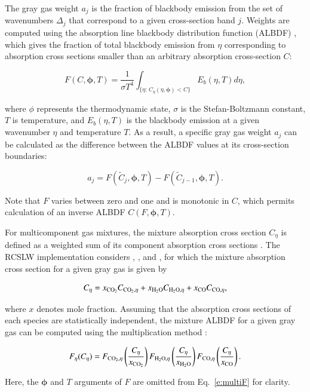 \documentclass[preprint,12pt]{elsarticle}
\newcommand{\BS}{\boldsymbol}
\newcounter{bla}
\begin{document}
The gray gas weight $a_j$ is the fraction of blackbody emission from the set of wavenumbers $\Delta_j$ that correspond to a given cross-section band $j$. Weights are computed using the absorption line blackbody distribution function (ALBDF) \cite{Pearson_2014}, which gives the fraction of total blackbody emission from $\eta$ corresponding to absorption cross sections smaller than an arbitrary absorption cross-section $C$:
%
\begin{linenomath}
\begin{equation} \label{e:albdf}
F(C,\BS{\phi},T) = \frac{1}{\sigma T^4}\int_{\{\eta:\,C_\eta(\eta,\BS{\phi})<C\}}E_b(\eta,T)d\eta,
\end{equation}
\end{linenomath}
%
where $\phi$ represents the thermodynamic state, $\sigma$ is the Stefan-Boltzmann constant, $T$ is temperature, and $E_b(\eta,T)$ is the blackbody emission at a given wavenumber $\eta$ and temperature $T$.
As a result, a specific gray gas weight $a_j$ can be calculated as the difference between the ALBDF values at its cross-section boundaries:
%
\begin{linenomath}
\begin{equation} \label{e:aj}
a_j = F(\tilde{C}_j,\BS{\phi}, T) - F(\tilde{C}_{j-1}, \BS{\phi},T).
\end{equation}
\end{linenomath}
%
Note that $F$ varies between zero and one and is monotonic in $C$, which permits calculation of an inverse ALBDF $C(F,\BS{\phi},T)$.

For multicomponent gas mixtures, the mixture absorption cross section $C_{\eta}$ is defined as a weighted sum of its component absorption cross sections \cite{Solovjov_2000}. The RCSLW implementation considers , , and , for which the mixture absorption cross section for a given gray gas is given by
%
\begin{linenomath}
\begin{equation} \label{e:multiC}
C_{\eta} = x_{\ce{CO2}}C_{\ce{CO2},\eta} + x_{\ce{H2O}}C_{\ce{H2O},\eta} + x_{\ce{CO}}C_{\ce{CO},\eta},
\end{equation}
\end{linenomath}
%
where $x$ denotes mole fraction.
Assuming that the absorption cross sections of each species are statistically independent, the mixture ALBDF for a given gray gas can be computed using the multiplication method \cite{Solovjov_2000}:
%
\begin{linenomath}
\begin{equation} \label{e:multiF}
F_{\eta}(C_{\eta}) = F_{\ce{CO2},\eta} \left( \frac{C_{\eta}}{x_{\ce{CO2}}} \right) F_{\ce{H2O},\eta} \left( \frac{C_{\eta}}{x_{\ce{H2O}}} \right) F_{\ce{CO},\eta} \left( \frac{C_{\eta}}{x_{\ce{CO}}} \right).
\end{equation}
\end{linenomath}
%
Here, the $\BS{\phi}$ and $T$ arguments of $F$ are omitted from Eq.~\ref{e:multiF} for clarity.
\end{document}
